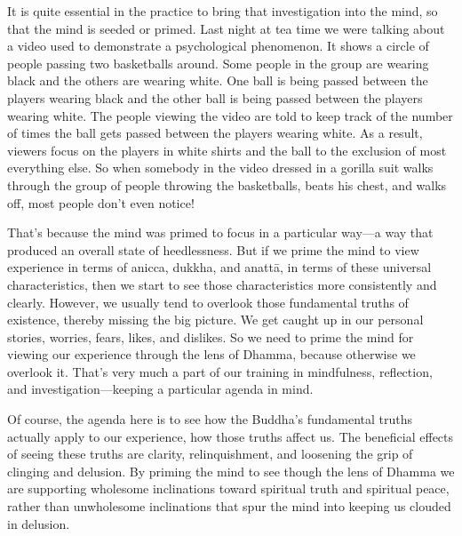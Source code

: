It is quite essential in the practice to bring that investigation into 
the mind, so that the mind is seeded or primed. Last night at tea time 
we were talking about a video used to demonstrate a psychological 
phenomenon. It shows a circle of people passing two basketballs around. 
Some people in the group are wearing black and the others are wearing 
white. One ball is being passed between the players wearing black and 
the other ball is being passed between the players wearing white. The 
people viewing the video are told to keep track of the number of times 
the ball gets passed between the players wearing white. As a result, 
viewers focus on the players in white shirts and the ball to the 
exclusion of most everything else. So when somebody in the video 
dressed in a gorilla suit walks through the group of people throwing 
the basketballs, beats his chest, and walks off, most people don't even 
notice!

That's because the mind was primed to focus in a particular way---a way 
that produced an overall state of heedlessness. But if we prime the 
mind to view experience in terms of anicca, dukkha, and anattā, in 
terms of these universal characteristics, then we start to see those 
characteristics more consistently and clearly. However, we usually tend 
to overlook those fundamental truths of existence, thereby missing the 
big picture. We get caught up in our personal stories, worries, fears, 
likes, and dislikes. So we need to prime the mind for viewing our 
experience through the lens of Dhamma, because otherwise we overlook 
it. That's very much a part of our training in mindfulness, reflection, 
and investigation---keeping a particular agenda in mind.

Of course, the agenda here is to see how the Buddha's fundamental 
truths actually apply to our experience, how those truths affect us. 
The beneficial effects of seeing these truths are clarity, 
relinquishment, and loosening the grip of clinging and delusion. By 
priming the mind to see though the lens of Dhamma we are supporting 
wholesome inclinations toward spiritual truth and spiritual peace, 
rather than unwholesome inclinations that spur the mind into keeping us 
clouded in delusion.


